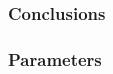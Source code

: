 \documentclass[12pt]{article}
\begin{document}
\subsubsection{Conclusions}
\subsubsection{Parameters}

\begin{comment}

\section{Interactive Evolution of Novel Sound Synthesis Algorithms}
\subsection{Motivation}
\begin{quote}
\emph{To seek out new tonalities, new timbres... \\
To boldly listen to what no one has heard before.} \citep{sethares2004tuning}
\end{quote}
\begin{quote}
The musical value of the computer does not lie, of course, in its ability to duplicate exactly what a real instrument can do, but rather in yielding an extended repertory of sounds, including and going beyond the classes of sounds of actual instruments. \citep{risset1969analysis}.
\end{quote}

The concept of timbre is largely compartmentalized by modern composers. Acoustic composers typically restrict themselves to given sounds, such as the sounds that instruments in a wind ensemble or orchestra can produce. Electronic and electro-acoustic composers have a wider timbral palette to work with but usually restrict themselves to working within the confines of available synthesizers and samples. It has a hard task to discover novel sounds from thoroughly investigated synthesis techniques. Wishart said in his book Audible Design \citep{wishart1994audible}:
\begin{quote}
The spectral characteristics of sound have, for so long, been inaccessible to the composer that we have become accustomed to lumping together all aspect of the spectral structure under the catch all term ``timbre''...
\end{quote}	 
These issues suggest the need for alternative and accessible methods of timbre investigation for musicians and researchers. Such capabilities could theoretically allow a musician to utilize an instrument they do not have physical access too from a single recording of its sound. Many electronic musicians utilize synthesis techniques such as additive, subtractive, ring modulation, amplitude modulation, and frequency modulation to create sounds. This paper will also present an interactive genetic algorithm for searching the space of sound synthesis algorithms of which these traditional synthesis techniques are a minuscule subset of the search space.


\end{comment}
\end{document}

